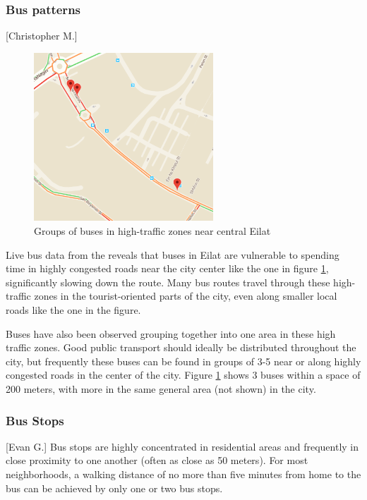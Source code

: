 \documentclass[12pt]{article}                               %
\begin{document}
\subsubsection{Bus patterns}[Christopher M.]
\begin{figure}[H]
    \centering
    \includegraphics[width=0.6\textwidth]{images/bus_clump_1.png}
    \caption{Groups of buses in high-traffic zones near central Eilat}
    \label{img:bus_clump_1}
\end{figure}

Live bus data from the reveals that buses in Eilat are vulnerable to spending time in highly congested roads near the city center like the one in figure \ref{img:bus_clump_1}, significantly slowing down the route. Many bus routes travel through these high-traffic zones in the tourist-oriented parts of the city, even along smaller local roads like the one in the figure.

Buses have also been observed grouping together into one area in these high traffic zones. Good public transport should ideally be distributed throughout the city, but frequently these buses can be found in groups of 3-5 near or along highly congested roads in the center of the city. Figure \ref{img:bus_clump_1} shows 3 buses within a space of 200 meters, with more in the same general area (not shown) in the city.

\subsubsection{Bus Stops}[Evan G.]
Bus stops are highly concentrated in residential areas and frequently in close proximity to one another (often as close as 50 meters). For most neighborhoods, a walking distance of no more than five minutes from home to the bus can be achieved by only one or two bus stops.
\end{document}
